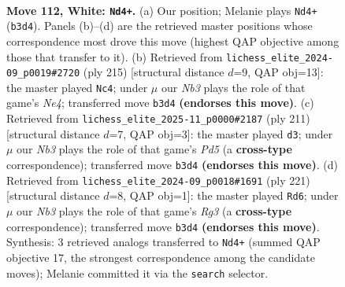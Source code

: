 \documentclass[11pt]{article}
\begin{document}
\clearpage

\begin{figure}[p]\centering
\begin{subfigure}{0.46\textwidth}\centering
\resizebox{\linewidth}{!}{%
\newchessgame
\chessboard[
  setfen={8/5R2/2k5/6K1/6P1/1N5r/8/8 w - - 7 112},
  showmover=false,
  pgfstyle=straightmove, color=movearrow, markmove={b3-d4}
]}
\caption{}
\end{subfigure}\hfill
\begin{subfigure}{0.46\textwidth}\centering
\resizebox{\linewidth}{!}{%
\newchessgame
\chessboard[
  setfen={4R3/8/8/4n3/8/1pr5/1k2K3/8 b - - 11 108},
  showmover=false,
  pgfstyle=straightmove, color=movearrow, markmove={e5-c4}
]}
\caption{}
\end{subfigure}
\\[4pt]
\begin{subfigure}{0.46\textwidth}\centering
\resizebox{\linewidth}{!}{%
\newchessgame
\chessboard[
  setfen={8/2R5/8/8/1p1p4/1k6/4r3/3K4 b - - 5 106},
  showmover=false,
  pgfstyle=straightmove, color=movearrow, markmove={d4-d3}
]}
\caption{}
\end{subfigure}\hfill
\begin{subfigure}{0.46\textwidth}\centering
\resizebox{\linewidth}{!}{%
\newchessgame
\chessboard[
  setfen={8/3R4/6r1/2pk4/8/2K5/8/8 b - - 19 111},
  showmover=false,
  pgfstyle=straightmove, color=movearrow, markmove={g6-d6}
]}
\caption{}
\end{subfigure}
\caption{\textbf{Move 112, White: \texttt{Nd4+}.} (a) Our position; Melanie plays \texttt{Nd4+} (\texttt{b3d4}). Panels (b)--(d) are the retrieved master positions whose correspondence most drove this move (highest QAP objective among those that transfer to it). (b) Retrieved from \texttt{lichess\_elite\_2024-09\_p0019\#2720} (ply 215) [structural distance $d$=9, QAP obj=13]: the master played \texttt{Nc4}; under $\mu$ our \emph{Nb3} plays the role of that game's \emph{Ne4}; transferred move \texttt{b3d4} \textbf{(endorses this move)}. (c) Retrieved from \texttt{lichess\_elite\_2025-11\_p0000\#2187} (ply 211) [structural distance $d$=7, QAP obj=3]: the master played \texttt{d3}; under $\mu$ our \emph{Nb3} plays the role of that game's \emph{Pd5} (a \textbf{cross-type} correspondence); transferred move \texttt{b3d4} \textbf{(endorses this move)}. (d) Retrieved from \texttt{lichess\_elite\_2024-09\_p0018\#1691} (ply 221) [structural distance $d$=8, QAP obj=1]: the master played \texttt{Rd6}; under $\mu$ our \emph{Nb3} plays the role of that game's \emph{Rg3} (a \textbf{cross-type} correspondence); transferred move \texttt{b3d4} \textbf{(endorses this move)}. Synthesis: 3 retrieved analogs transferred to \texttt{Nd4+} (summed QAP objective 17, the strongest correspondence among the candidate moves); Melanie committed it via the \texttt{search} selector.}
\label{fig:thought-m222}
\end{figure}
\end{document}
